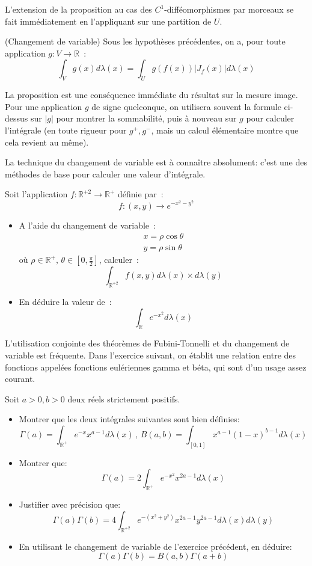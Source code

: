 \begin{rem}
 L'extension de la proposition au cas des $C^1$-difféo\-morphismes par
morceaux se fait immédiatement en l'appliquant sur une partition de
$U$.
\end{rem}
\begin{mandatory}
\begin{prop}{(Changement de variable)}
Sous les hypothèses précédentes, on a, pour toute application $g : V
\to \mathbb{R}$~:
\[
\int_V g(x) d \lambda(x) = \int_U g(f(x)) |J_f(x)| d \lambda(x)
\]
\end{prop}
\end{mandatory}
\begin{rem}
La proposition est une conséquence immédiate du résultat sur la mesure
image. Pour une application $g$ de signe quelconque, on utilisera souvent
la formule ci-dessus sur $|g|$ pour montrer la sommabilité, puis à
nouveau sur $g$ pour calculer l'intégrale (en toute rigueur pour
$g^+,g^-$, mais un calcul élémentaire montre que cela revient au même).
\end{rem}
La technique du changement de variable est à connaître absolument: c'est une
des méthodes de base pour calculer une valeur d'intégrale.
\begin{exercice}
Soit l'application $f : \mathbb{R}^{+2} \to \mathbb{R}^+$ définie par~:
\[
f : (x,y) \to e^{-x^2 -y^2}
\]
\begin{itemize}
\item A l'aide du changement de variable~:
\[
\begin{array}{c}
x = \rho \cos \theta \\
y = \rho \sin \theta 
\end{array}
\]
où $\rho \in \mathbb{R}^+, \, \theta \in [0, \frac{\pi}{2}]$, calculer~:
\[
\int_{\mathbb{R}^{+2}} f(x,y) d \lambda(x) \times d \lambda(y)
\]
\item En déduire la valeur de~:
\[
\int_{\mathbb{R}} e^{-x^2} d \lambda (x)
\]
\end{itemize}
\end{exercice}
L'utilisation conjointe des théorèmes de Fubini-Tonnelli et du changement de
variable est fréquente. Dans l'exercice suivant, on établit une relation entre
des fonctions appelées fonctions eulériennes gamma et béta, qui sont d'un usage
assez courant.
\begin{exercice}
Soit $a>0, b>0$ deux réels strictement positifs. 
\begin{itemize}
  \item Montrer que les deux intégrales
suivantes sont bien définies:
\[
\Gamma(a) = \int_{\mathbb{R}^+} e^{-x}x^{a-1} d\lambda(x) \, , \, B(a,b) =
\int_{[0,1]} x^{a-1}(1-x)^{b-1} d \lambda(x)
\]
\item Montrer que:
\[
\Gamma(a) = 2 \int_{\mathbb{R}^+} e^{-x^2} x^{2a-1} d \lambda(x)
\]
\item Justifier avec précision que:
\[
\Gamma(a)\Gamma(b) = 4 \int_{\mathbb{R}^{+2}}
e^{-(x^2+y^2)}x^{2a-1}y^{2a-1}d\lambda(x) d\lambda(y)
\]
\item En utilisant le changement de variable de l'exercice précédent, en
déduire:
\[
\Gamma(a)\Gamma(b)=B(a,b)\Gamma(a+b)
\]
\end{itemize}

\end{exercice}
